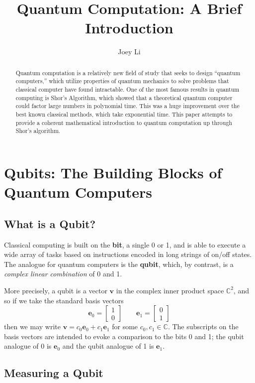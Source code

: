 \documentclass[a4paper]{article}
\title{Quantum Computation: A Brief Introduction}
\author{Joey Li}
\newcommand\0{\mathbf{0}}
\newcommand\ee{\mathbf{e}}
\newcommand\vv{\mathbf{v}}
\newcommand\CC{\mathbb{C}}
\newcommand\<{\langle}
\renewcommand\>{\rangle}
\begin{document}
\maketitle

\begin{abstract}
Quantum computation is a relatively new field of study that seeks to design ``quantum computers,'' which utilize properties of quantum mechanics to solve problems that classical computer have found intractable. One of the most famous results in quantum computing is Shor's Algorithm, which showed that a theoretical quantum computer could factor large numbers in polynomial time. This was a huge improvement over the best known classical methods, which take exponential time. This paper attempts to provide a coherent mathematical introduction to quantum computation up through Shor's algorithm.
\end{abstract}

\section{Qubits: The Building Blocks of Quantum Computers}

\subsection{What is a Qubit?}

Classical computing is built on the \textbf{bit}, a single 0 or 1, and is able to execute a wide array of tasks based on instructions encoded in long strings of on/off states. The analogue for quantum computers is the \textbf{qubit}, which, by contrast, is a \textit{complex linear combination} of 0 and 1.

More precisely, a qubit is a vector $\vv$ in the complex inner product space $\CC^2$, and so if we take the standard basis vectors 
$$\ee_0 = \begin{bmatrix}1 \\ 0\end{bmatrix} \qquad \ee_1 = \begin{bmatrix} 0 \\ 1\end{bmatrix}$$
then we may write $\vv = c_0\ee_0+c_1\ee_1$ for some $c_0,c_1\in \CC$. The subscripts on the basis vectors are intended to evoke a comparison to the bits 0 and 1; the qubit analogue of 0 is $\ee_0$ and the qubit analogue of 1 is $\ee_1$. 

\subsection{Measuring a Qubit}
\end{document}
